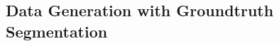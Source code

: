 \documentclass[../report.tex]{subfiles}
\begin{document}
\subsection{Data Generation with Groundtruth Segmentation}





\end{document}
